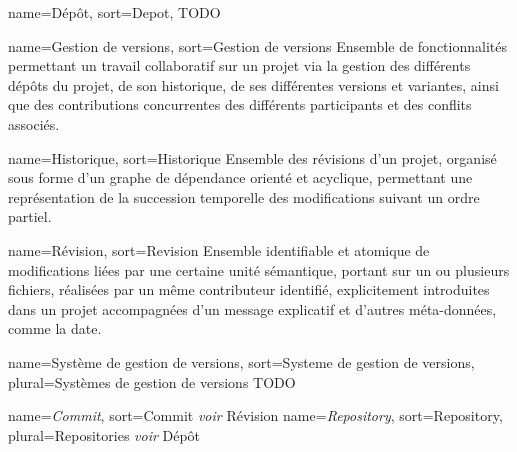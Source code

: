 
{
name=Dépôt,
sort=Depot,
}
{TODO}

{
name=Gestion de versions,
sort=Gestion de versions
}
{Ensemble de fonctionnalités permettant un travail collaboratif sur un projet via la gestion des différents dépôts du projet, de son historique, de ses différentes versions et variantes, ainsi que des contributions concurrentes des différents participants et des conflits associés.}

{
name=Historique,
sort=Historique
}
{Ensemble des révisions d'un projet, organisé sous forme d'un graphe de dépendance orienté et acyclique, permettant une représentation de la succession temporelle des modifications suivant un ordre partiel.}

{
name=Révision,
sort=Revision
}
{Ensemble identifiable et atomique de modifications liées par une certaine unité sémantique, portant sur un ou plusieurs fichiers, réalisées par un même contributeur identifié, explicitement introduites dans un projet accompagnées d'un message explicatif et d'autres méta-données, comme la date.}

{
  name=Système de gestion de versions,
  sort=Systeme de gestion de versions,
  plural=Systèmes de gestion de versions
}
{TODO}

{
name={\it Commit\/},
sort=Commit
}
{{\it voir\/} Révision}
{
  name={\it Repository\/},
  sort=Repository,
  plural=Repositories
}
{{\it voir\/} Dépôt}